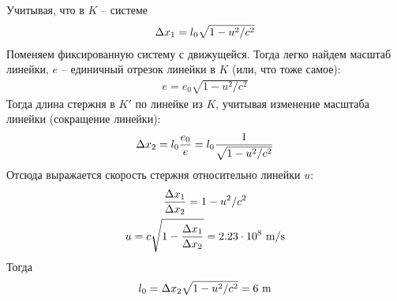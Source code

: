 \documentclass[a5paper,10pt]{article}\usepackage[usenames,dvipsnames]{color}\usepackage{extsizes,cmap,graphicx,misccorr,indentfirst,makecell,multirow,ulem,geometry,amssymb,amsfonts,amsmath,amsthm,titlesec,float,fancyhdr,wrapfig,tikz}\usepackage[T2A]{fontenc}\usepackage[utf8x]{inputenc}\usepackage[english, russian]{babel}\usetikzlibrary{decorations.pathreplacing,decorations.pathmorphing,patterns,calc,scopes,arrows,through,positioning,shapes.misc}\graphicspath{{img/}}\linespread{1.3}\frenchspacing\geometry{left=1cm, right=1cm, top=2cm, bottom=1cm, bindingoffset=0cm}\pagestyle{fancy}\fancyhead{}\fancyhead[R]{Сарафанов Ф.Г.}
\begin{document}
\def\g{\sqrt{1-u^2/c^2}}%
Учитывая, что в $K$ -- системе
\begin{gather*}
    \xdef\dx{\Delta{x_1}}%
    \xdef\dxx{\Delta{x_2}}%
    \dx=l_0\g
\end{gather*}
Поменяем фиксированную систему с движущейся. Тогда легко найдем масштаб линейки, $e$ -- единичный отрезок линейки в $K$ (или, что тоже самое):
\begin{gather*}
    e=e_0\g
\end{gather*}
Тогда длина стержня в $K'$ по линейке из $K$, учитывая изменение масштаба линейки (сокращение линейки):
\begin{gather*}
    \dxx=l_0\frac{e_0}{e}=l_0\frac{1}{\g}
\end{gather*}
Отсюда выражается скорость стержня относительно линейки $u$:
\begin{gather*}
    \frac{\dx}{\dxx}=1-u^2/c^2\\
    u=c\sqrt{1-\frac{\dx}{\dxx}}=2.23\cdot10^8\text{ m/s}
\end{gather*}
Тогда 
\begin{equation*}
    l_0=\dxx\g=6\text{ m}
\end{equation*}
\end{document}
